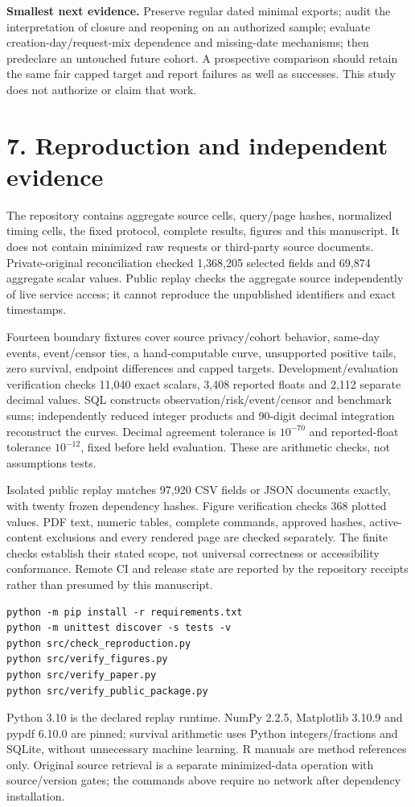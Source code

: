 \documentclass[10pt,letterpaper]{article}
\begin{document}
\textbf{Smallest next evidence.} Preserve regular dated minimal exports; audit the interpretation of closure and reopening on an authorized sample; evaluate creation-day/request-mix dependence and missing-date mechanisms; then predeclare an untouched future cohort. A prospective comparison should retain the same fair capped target and report failures as well as successes. This study does not authorize or claim that work.

\clearpage
\section*{7. Reproduction and independent evidence}
The repository contains aggregate source cells, query/page hashes, normalized timing cells, the fixed protocol, complete results, figures and this manuscript. It does not contain minimized raw requests or third-party source documents. Private-original reconciliation checked 1,368,205 selected fields and 69,874 aggregate scalar values. Public replay checks the aggregate source independently of live service access; it cannot reproduce the unpublished identifiers and exact timestamps.

Fourteen boundary fixtures cover source privacy/cohort behavior, same-day events, event/censor ties, a hand-computable curve, unsupported positive tails, zero survival, endpoint differences and capped targets. Development/evaluation verification checks 11,040 exact scalars, 3,408 reported floats and 2,112 separate decimal values. SQL constructs observation/risk/event/censor and benchmark sums; independently reduced integer products and 90-digit decimal integration reconstruct the curves. Decimal agreement tolerance is $10^{-70}$ and reported-float tolerance $10^{-12}$, fixed before held evaluation. These are arithmetic checks, not assumptions tests.

Isolated public replay matches 97,920 CSV fields or JSON documents exactly, with twenty frozen dependency hashes. Figure verification checks 368 plotted values. PDF text, numeric tables, complete commands, approved hashes, active-content exclusions and every rendered page are checked separately. The finite checks establish their stated scope, not universal correctness or accessibility conformance. Remote CI and release state are reported by the repository receipts rather than presumed by this manuscript.

\begin{verbatim}
python -m pip install -r requirements.txt
python -m unittest discover -s tests -v
python src/check_reproduction.py
python src/verify_figures.py
python src/verify_paper.py
python src/verify_public_package.py
\end{verbatim}
Python 3.10 is the declared replay runtime. NumPy 2.2.5, Matplotlib 3.10.9 and pypdf 6.10.0 are pinned; survival arithmetic uses Python integers/fractions and SQLite, without unnecessary machine learning. R manuals are method references only. Original source retrieval is a separate minimized-data operation with source/version gates; the commands above require no network after dependency installation.
\end{document}
